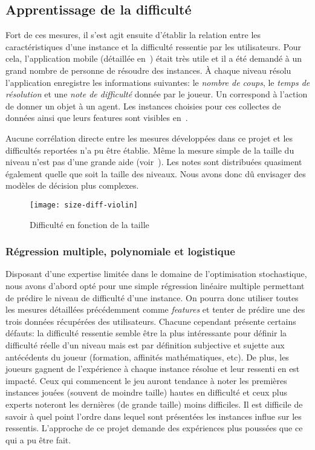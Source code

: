 \documentclass[../main.tex]{subfiles}
\begin{document}
	\subsection{Apprentissage de la difficulté}
	
	Fort de ces mesures, il s'est agit ensuite d'établir la relation entre les caractéristiques d'une instance et la difficulté ressentie par les utilisateurs. Pour cela, l'application mobile (détaillée en~) était très utile et il a été demandé à un grand nombre de personne de résoudre des instances. À chaque niveau résolu l'application enregistre les informations suivantes: le \textit{nombre de coups}, le \textit{temps de résolution} et une \textit{note de difficulté} donnée par le joueur. Un  correspond à l'action de donner un objet à un agent. Les instances choisies pour ces collectes de données ainsi que leurs features sont visibles en~.
	
	Aucune corrélation directe entre les mesures développées dans ce projet et les difficultés reportées n'a pu être établie. Même la mesure simple de la taille du niveau n'est pas d'une grande aide (voir~). Les notes sont distribuées quasiment également quelle que soit la taille des niveaux. Nous avons donc dû envisager des modèles de décision plus complexes.
	
	\begin{figure}[ht!]
	    \centering
	    \texttt{[image: size-diff-violin]}
	    \caption{Difficulté en fonction de la taille}
	    \label{fig-size-diff}
	\end{figure}
	
	\subsubsection{Régression multiple, polynomiale et logistique}
	
	Disposant d'une expertise limitée dans le domaine de l'optimisation stochastique, nous avons d'abord opté pour une simple régression linéaire multiple permettant de prédire le niveau de difficulté d'une instance. On pourra donc utiliser toutes les mesures détaillées précédemment comme \textit{features} et tenter de prédire une des trois données récupérées des utilisateurs. Chacune cependant présente certains défauts: la difficulté ressentie semble être la plus intéressante pour définir la difficulté réelle d'un niveau mais est par définition subjective et sujette aux antécédents du joueur (formation, affinités mathématiques, etc). De plus, les joueurs gagnent de l'expérience à chaque instance résolue et leur ressenti en est impacté. Ceux qui commencent le jeu auront tendance à noter les premières instances jouées (souvent de moindre taille) hautes en difficulté et ceux plus experts noteront les dernières (de grande taille) moins difficiles. Il est difficile de savoir à quel point l'ordre dans lequel sont présentées les instances influe sur les ressentis. L'approche de ce projet demande des expériences plus poussées que ce qui a pu être fait.
	
\end{document}
